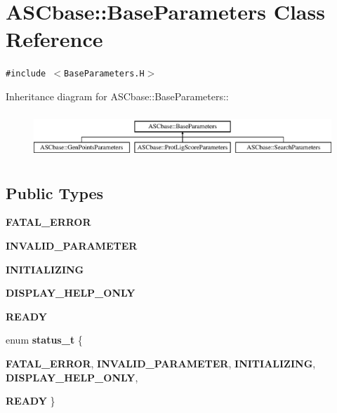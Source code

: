 \section{ASCbase::Base\-Parameters Class Reference}
\label{classASCbase_1_1BaseParameters}
{\tt \#include $<$Base\-Parameters.H$>$}

Inheritance diagram for ASCbase::Base\-Parameters::\begin{figure}[H]
\begin{center}
\leavevmode
\includegraphics[height=1.72043cm]{classASCbase_1_1BaseParameters}
\end{center}
\end{figure}
\subsection*{Public Types}
\begin{CompactItemize}
\item 
\textbf{FATAL\_\-ERROR}\label{classASCbase_1_1BaseParameters_c80c7d6d1460ac21aee9af9e4adb27962ecf94b471dd1d92cfef939f1d8e5c5b}

\item 
\textbf{INVALID\_\-PARAMETER}\label{classASCbase_1_1BaseParameters_c80c7d6d1460ac21aee9af9e4adb27966a7dcbce394da1874589a864461ca96c}

\item 
\textbf{INITIALIZING}\label{classASCbase_1_1BaseParameters_c80c7d6d1460ac21aee9af9e4adb2796e0f14c6cff9f988fb50cd648984af4c8}

\item 
\textbf{DISPLAY\_\-HELP\_\-ONLY}\label{classASCbase_1_1BaseParameters_c80c7d6d1460ac21aee9af9e4adb2796009c052e63810d9249f5ba6d26733fcb}

\item 
\textbf{READY}\label{classASCbase_1_1BaseParameters_c80c7d6d1460ac21aee9af9e4adb27965688a5856aa9d26946abec13ed716dac}

\item 
enum \textbf{status\_\-t} \{ \par
\textbf{FATAL\_\-ERROR}, 
\textbf{INVALID\_\-PARAMETER}, 
\textbf{INITIALIZING}, 
\textbf{DISPLAY\_\-HELP\_\-ONLY}, 
\par
\textbf{READY}
 \}
\end{CompactItemize}
